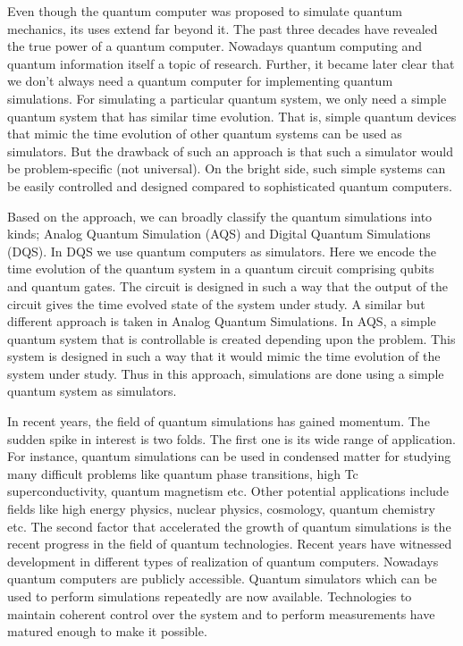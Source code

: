 \documentclass[12pt,a4paper]{report}
\begin{document}
Even though the quantum computer was proposed to simulate quantum mechanics, its uses extend far beyond it. The past three decades have revealed the true power of a quantum computer. Nowadays quantum computing and quantum information itself a topic of research. Further, it became later clear that we don’t always need a quantum computer for implementing quantum simulations. For simulating a particular quantum system, we only need a simple quantum system that has similar time evolution. That is, simple quantum devices that mimic the time evolution of other quantum systems can be used as simulators. But the drawback of such an approach is that such a simulator would be problem-specific (not universal). On the bright side, such simple systems can be easily controlled and designed compared to sophisticated quantum computers.

Based on the approach, we can broadly classify the quantum simulations into kinds; Analog Quantum Simulation (AQS) and Digital Quantum Simulations (DQS). In DQS we use quantum computers as simulators. Here we encode the time evolution of the quantum system in a quantum circuit comprising qubits and quantum gates.  The circuit is designed in such a way that the output of the circuit gives the time evolved state of the system under study.  A similar but different approach is taken in Analog Quantum Simulations. In AQS, a simple quantum system that is controllable is created depending upon the problem. This system is designed in such a way that it would mimic the time evolution of the system under study. Thus in this approach, simulations are done using a simple quantum system as simulators.

In recent years, the field of quantum simulations has gained momentum. The sudden spike in interest is two folds. The first one is its wide range of application. For instance, quantum simulations can be used in condensed matter for studying many difficult problems like quantum phase transitions, high Tc superconductivity, quantum magnetism etc. Other potential applications include fields like high energy physics, nuclear physics, cosmology, quantum chemistry etc. The second factor that accelerated the growth of quantum simulations is the recent progress in the field of quantum technologies. Recent years have witnessed development in different types of realization of quantum computers. Nowadays quantum computers are publicly accessible. Quantum simulators which can be used to perform simulations repeatedly are now available. Technologies to maintain coherent control over the system and to perform measurements have matured enough to make it possible.
\end{document}
